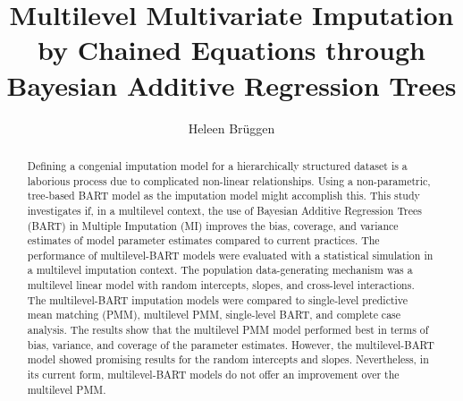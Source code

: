 \documentclass[3p,12pt,a4paper]{elsarticle}
\begin{document}
\begin{frontmatter}
\title{Multilevel Multivariate Imputation by Chained Equations through Bayesian Additive Regression Trees}

\author[1]{Heleen Brüggen}



\begin{abstract} %
    Defining a congenial imputation model for a hierarchically structured dataset is a laborious process due to complicated non-linear relationships. Using a non-parametric, tree-based BART model as the imputation model might accomplish this. This study investigates if, in a multilevel context, the use of Bayesian Additive Regression Trees (BART) in Multiple Imputation (MI) improves the bias, coverage, and variance estimates of model parameter estimates compared to current practices. The performance of multilevel-BART models were evaluated with a statistical simulation in a multilevel imputation context. The population data-generating mechanism was a multilevel linear model with random intercepts, slopes, and cross-level interactions. The multilevel-BART imputation models were compared to single-level predictive mean matching (PMM), multilevel PMM, single-level BART, and complete case analysis. The results show that the multilevel PMM model performed best in terms of bias, variance, and coverage of the parameter estimates. However, the multilevel-BART model showed promising results for the random intercepts and slopes. Nevertheless, in its current form, multilevel-BART models do not offer an improvement over the multilevel PMM.
\end{abstract}
\end{frontmatter}

\newpage
\tableofcontents
\newpage
\end{document}
